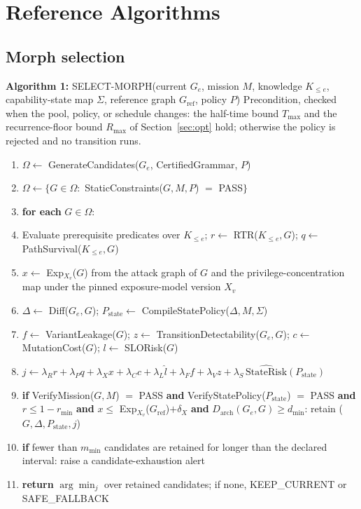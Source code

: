 \documentclass[11pt,letterpaper]{article}
\begin{document}
\section{Reference Algorithms}

\subsection{Morph selection}

\noindent\textbf{Algorithm 1:} SELECT-MORPH(current $G_e$, mission $M$, knowledge $K_{\le e}$, capability-state map $\Sigma$, reference graph $G_{\mathrm{ref}}$, policy $P$)
\noindent Precondition, checked when the pool, policy, or schedule changes: the half-time bound $T_{\max}$ and the recurrence-floor bound $R_{\max}$ of Section~\ref{sec:opt} hold; otherwise the policy is rejected and no transition runs.
\begin{enumerate}[leftmargin=2.2em,itemsep=1pt,label=\arabic*.]
\item $\Omega\leftarrow$ GenerateCandidates($G_e$, CertifiedGrammar, $P$)
\item $\Omega\leftarrow\{G\in\Omega:$ StaticConstraints($G,M,P$) $=$ PASS$\}$
\item \textbf{for each} $G\in\Omega$:
\item \quad Evaluate prerequisite predicates over $K_{\le e}$; $r\leftarrow$ RTR($K_{\le e},G$); $q\leftarrow$ PathSurvival($K_{\le e},G$)
\item \quad $x\leftarrow$ Exp$_{X_v}$($G$) from the attack graph of $G$ and the privilege-concentration map under the pinned exposure-model version $X_v$
\item \quad $\Delta\leftarrow$ Diff($G_e,G$); $P_{\mathrm{state}}\leftarrow$ CompileStatePolicy($\Delta,M,\Sigma$)
\item \quad $f\leftarrow$ VariantLeakage($G$); $z\leftarrow$ TransitionDetectability($G_e,G$); $c\leftarrow$ MutationCost($G$); $l\leftarrow$ SLORisk($G$)
\item \quad $j\leftarrow\lambda_Rr+\lambda_Pq+\lambda_Xx+\lambda_C\hat c+\lambda_L\hat l+\lambda_Ff+\lambda_Vz+\lambda_S\,\widehat{\mathrm{StateRisk}}(P_{\mathrm{state}})$
\item \quad \textbf{if} VerifyMission($G,M$) $=$ PASS \textbf{and} VerifyStatePolicy($P_{\mathrm{state}}$) $=$ PASS \textbf{and} $r\le1-r_{\min}$ \textbf{and} $x\le$ Exp$_{X_v}$($G_{\mathrm{ref}}$)$+\delta_X$ \textbf{and} $D_{\mathrm{arch}}(G_e,G)\ge d_{\min}$: retain ($G,\Delta,P_{\mathrm{state}},j$)
\item \textbf{if} fewer than $m_{\min}$ candidates are retained for longer than the declared interval: raise a candidate-exhaustion alert
\item \textbf{return} $\arg\min_j$ over retained candidates; if none, KEEP\_CURRENT or SAFE\_FALLBACK
\end{enumerate}
\end{document}
